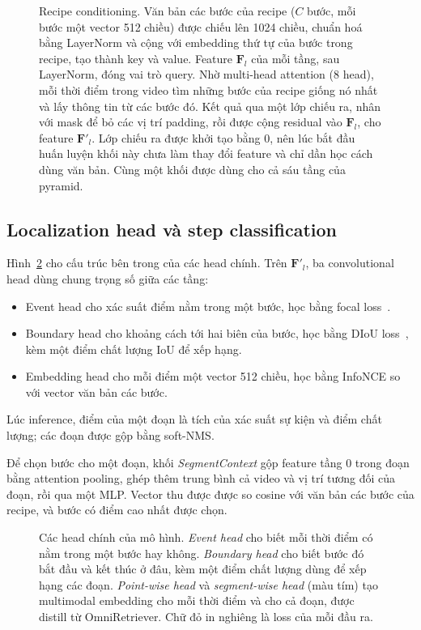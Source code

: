 \documentclass{IEEEtran}
\begin{document}
\begin{figure}[t]
\centering
\resizebox{\columnwidth}{!}{}
\caption{Recipe conditioning. Văn bản các bước của recipe ($C$ bước, mỗi bước một vector 512 chiều) được chiếu lên 1024 chiều, chuẩn hoá bằng LayerNorm và cộng với embedding thứ tự của bước trong recipe, tạo thành key và value. Feature $\mathbf{F}_l$ của mỗi tầng, sau LayerNorm, đóng vai trò query. Nhờ multi-head attention (8 head), mỗi thời điểm trong video tìm những bước của recipe giống nó nhất và lấy thông tin từ các bước đó. Kết quả qua một lớp chiếu ra, nhân với mask để bỏ các vị trí padding, rồi được cộng residual vào $\mathbf{F}_l$, cho feature $\mathbf{F}'_l$. Lớp chiếu ra được khởi tạo bằng 0, nên lúc bắt đầu huấn luyện khối này chưa làm thay đổi feature và chỉ dần học cách dùng văn bản. Cùng một khối được dùng cho cả sáu tầng của pyramid.}
\label{fig:recipecond}
\end{figure}

\subsection{Localization head và step classification}
Hình~\ref{fig:heads} cho cấu trúc bên trong của các head chính. Trên $\mathbf{F}'_l$, ba convolutional head dùng chung trọng số giữa các tầng:
\begin{itemize}
\item Event head cho xác suất điểm nằm trong một bước, học bằng focal loss~\cite{focal}.
\item Boundary head cho khoảng cách tới hai biên của bước, học bằng DIoU loss~\cite{diou}, kèm một điểm chất lượng IoU để xếp hạng.
\item Embedding head cho mỗi điểm một vector 512 chiều, học bằng InfoNCE so với vector văn bản các bước.
\end{itemize}
Lúc inference, điểm của một đoạn là tích của xác suất sự kiện và điểm chất lượng; các đoạn được gộp bằng soft-NMS.

Để chọn bước cho một đoạn, khối \emph{SegmentContext} gộp feature tầng 0 trong đoạn bằng attention pooling, ghép thêm trung bình cả video và vị trí tương đối của đoạn, rồi qua một MLP. Vector thu được được so cosine với văn bản các bước của recipe, và bước có điểm cao nhất được chọn.

\begin{figure}[t]
\centering
\resizebox{\textwidth}{!}{}
\caption{Các head chính của mô hình. \emph{Event head} cho biết mỗi thời điểm có nằm trong một bước hay không. \emph{Boundary head} cho biết bước đó bắt đầu và kết thúc ở đâu, kèm một điểm chất lượng dùng để xếp hạng các đoạn. \emph{Point-wise head} và \emph{segment-wise head} (màu tím) tạo multimodal embedding cho mỗi thời điểm và cho cả đoạn, được distill từ OmniRetriever. Chữ đỏ in nghiêng là loss của mỗi đầu ra.}
\label{fig:heads}
\end{figure}
\end{document}
